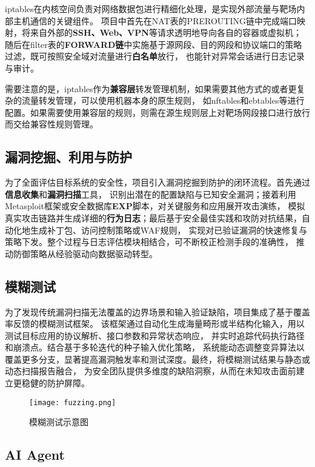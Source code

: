 \documentclass[lang=cn,10pt]{elegantbook}
\begin{document}
iptables在内核空间负责对网络数据包进行精细化处理，是实现外部流量与靶场内部主机通信的关键组件。
项目中首先在NAT表的PREROUTING链中完成端口映射，将来自外部的\textbf{SSH、Web、VPN}等请求透明地导向各自的容器或虚拟机；
随后在filter表的\textbf{FORWARD链}中实施基于源网段、目的网段和协议端口的策略过滤，既可按照安全域对流量进行\textbf{白名单}放行，
也能针对异常会话进行日志记录与审计。

需要注意的是，iptables作为\textbf{兼容层}转发管理机制，如果需要其他方式的或者更复杂的流量转发管理，可以使用机器本身的原生规则，
如nftables和ebtables等进行配置。如果需要使用兼容层的规则，则需在源生规则层上对靶场网段接口进行放行而交给兼容性规则管理。


\subsection{漏洞挖掘、利用与防护}
为了全面评估目标系统的安全性，项目引入漏洞挖掘到防护的闭环流程。首先通过\textbf{信息收集}和\textbf{漏洞扫描}工具，
识别出潜在的配置缺陷与已知安全漏洞；接着利用Metasploit框架或安全数据库\textbf{EXP}脚本，对关键服务和应用展开攻击演练，
模拟真实攻击链路并生成详细的\textbf{行为日志}；最后基于安全最佳实践和攻防对抗结果，自动化地生成补丁包、访问控制策略或WAF规则，
实现对已验证漏洞的快速修复与策略下发。整个过程与日志评估模块相结合，可不断校正检测手段的准确性，
推动防御策略从经验驱动向数据驱动转型。

\subsection{模糊测试}
为了发现传统漏洞扫描无法覆盖的边界场景和输入验证缺陷，项目集成了基于覆盖率反馈的模糊测试框架。
该框架通过自动化生成海量畸形或半结构化输入，用以测试目标应用的协议解析、接口参数和异常状态响应，
并实时追踪代码执行路径和崩溃点。结合基于多轮迭代的种子输入优化策略，
系统能动态调整变异算法以覆盖更多分支，显著提高漏洞触发率和测试深度。最终，将模糊测试结果与静态或动态扫描报告融合，
为安全团队提供多维度的缺陷洞察，从而在未知攻击面前建立更稳健的防护屏障。

\begin{figure}[!h]
\centering
\texttt{[image: fuzzing.png]}  %
\caption{模糊测试示意图}  %
\label{fig:fuzzing}  %
\end{figure}

\subsection{AI Agent}
\end{document}
